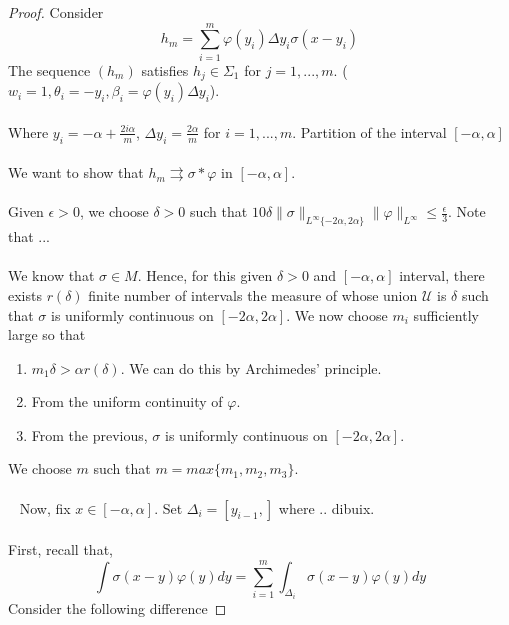 \documentclass[../main.tex]{subfiles}
\begin{document}
	\begin{proof} %
		Consider $$h_m= \sum_{i=1}^m\varphi(y_i)\Delta y_i \sigma(x-y_i)$$ 
		The sequence $(h_m)$ satisfies $h_j\in \Sigma_1$ for $j=1,...,m$. ($w_i=1,\theta_i=-y_i, \beta_i=\varphi(y_i)\Delta y_i$).\\ \\ 
		Where $y_i=-\alpha + \frac{2i\alpha}{m}$, $\Delta y_i=\frac{2\alpha}{m}$ for $i=1,...,m$. Partition of the interval $[-\alpha,\alpha]$ \\ \\ We want to show that $h_m \rightrightarrows \sigma \ast \varphi $ in $[-\alpha,\alpha]$.  \\ \\
		Given $\epsilon >0$, we choose $\delta >0$ such that $10\delta \| \sigma\|_{L^\infty\{-2\alpha,2\alpha\}}\|\varphi \|_{L^\infty} \leq \frac{\epsilon}{3}$. Note that ... \\ \\ 
		We know that $\sigma \in M$. Hence, for this given $\delta>0$ and $[-\alpha,\alpha]$ interval, there exists $r(\delta)$ finite number of intervals the measure of whose union $\mathscr{U}$ is $\delta$ such that $\sigma$ is uniformly continuous on $[-2\alpha,2\alpha]$. We now choose $m_i$ sufficiently large so that
		\begin{enumerate}
			\item $m_1 \delta > \alpha r(\delta)$. We can do this by Archimedes' principle.
			\item From the uniform continuity of $\varphi$.
			\item From the previous, $\sigma$ is uniformly continuous on  $[-2\alpha,2\alpha]$. 
		\end{enumerate}
		We choose $m$ such that $m=max\{m_1,m_2,m_3\}$. \\ \\ 
		Now, fix $x\in [-\alpha,\alpha] $. Set $\Delta_i= [y_{i-1},]$ where .. dibuix. \\ \\
		First, recall that,\\
		$$\int \sigma(x-y)\varphi(y)dy = \sum_{i=1}^m \int_{\Delta_i}\sigma(x-y)\varphi(y)dy$$
		Consider the following difference 


\end{proof}
\end{document}
